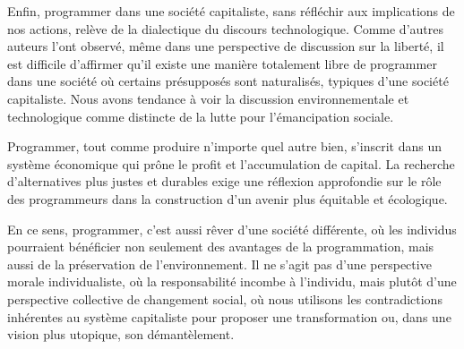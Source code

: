 Enfin, programmer dans une société capitaliste, sans réfléchir aux implications de nos actions, relève de la dialectique du discours technologique. Comme d’autres auteurs l’ont observé, même dans une perspective de discussion sur la liberté, il est difficile d’affirmer qu’il existe une manière totalement libre de programmer dans une société où certains présupposés sont naturalisés, typiques d’une société capitaliste. Nous avons tendance à voir la discussion environnementale et technologique comme distincte de la lutte pour l’émancipation sociale.

Programmer, tout comme produire n’importe quel autre bien, s’inscrit dans un système économique qui prône le profit et l’accumulation de capital. La recherche d’alternatives plus justes et durables exige une réflexion approfondie sur le rôle des programmeurs dans la construction d’un avenir plus équitable et écologique.

En ce sens, programmer, c’est aussi rêver d’une société différente, où les individus pourraient bénéficier non seulement des avantages de la programmation, mais aussi de la préservation de l’environnement. Il ne s’agit pas d’une perspective morale individualiste, où la responsabilité incombe à l’individu, mais plutôt d’une perspective collective de changement social, où nous utilisons les contradictions inhérentes au système capitaliste pour proposer une transformation ou, dans une vision plus utopique, son démantèlement.